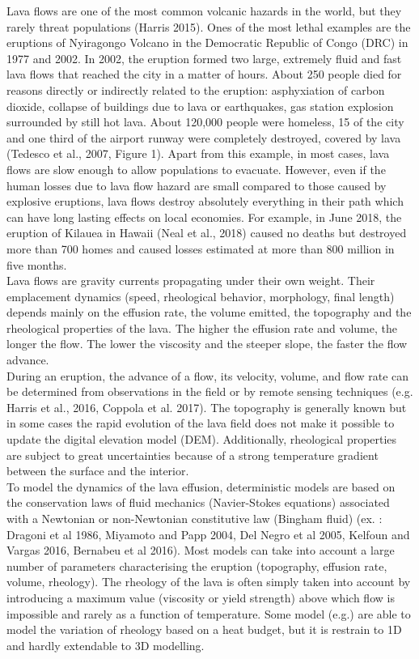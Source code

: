 \documentclass[11pt,a4paper]{article}
\begin{document}
Lava flows are one of the most common volcanic hazards in the world, but they rarely threat populations (Harris 2015). Ones of the most lethal examples are the eruptions of Nyiragongo Volcano in the Democratic Republic of Congo (DRC) in 1977 and 2002. In 2002, the eruption formed two large, extremely fluid and fast lava flows that reached the city in a matter of hours. About 250 people died for reasons directly or indirectly related to the eruption: asphyxiation of carbon dioxide, collapse of buildings due to lava or earthquakes, gas station explosion surrounded by still hot lava. About 120,000 people were homeless, 15 of the city and one third of the airport runway were completely destroyed, covered by lava (Tedesco et al., 2007, Figure 1). Apart from this example, in most cases, lava flows are slow enough to allow populations to evacuate. However, even if the human losses due to lava flow hazard are small compared to those caused by explosive eruptions, lava flows destroy absolutely everything in their path which can have long lasting effects on local economies. For example, in June 2018, the eruption of Kilauea in Hawaii (Neal et al., 2018) caused no deaths but destroyed more than 700 homes and caused losses estimated at more than 800 million in five months.\\
Lava flows are gravity currents propagating under their own weight. Their emplacement dynamics (speed, rheological behavior, morphology, final length) depends mainly on the effusion rate, the volume emitted, the topography and the rheological properties of the lava. The higher the effusion rate and volume, the longer the flow. The lower the viscosity and the steeper slope, the faster the flow advance. \\
During an eruption, the advance of a flow, its velocity, volume, and flow rate can be determined from observations in the field or by remote sensing techniques (e.g. Harris et al., 2016, Coppola et al. 2017). The topography is generally known but in some cases the rapid evolution of the lava field does not make it possible to update the digital elevation model (DEM). Additionally, rheological properties are subject to great uncertainties because of a strong temperature gradient between the surface and the interior.\\
To model the dynamics of the lava effusion, deterministic models are based on the conservation laws of fluid mechanics (Navier-Stokes equations) associated with a Newtonian or non-Newtonian constitutive law (Bingham fluid) (ex. : Dragoni et al 1986, Miyamoto and Papp 2004, Del Negro et al 2005, Kelfoun and Vargas 2016, Bernabeu et al 2016). Most models can take into account a large number of parameters characterising the eruption (topography, effusion rate, volume, rheology). The rheology of the lava is often simply taken into account by introducing a maximum value (viscosity or yield strength) above which flow is impossible and rarely as a function of temperature. Some model (e.g.) are able to model the variation of rheology based on a heat budget, but it is restrain to 1D and hardly extendable to 3D modelling. \\
\end{document}
